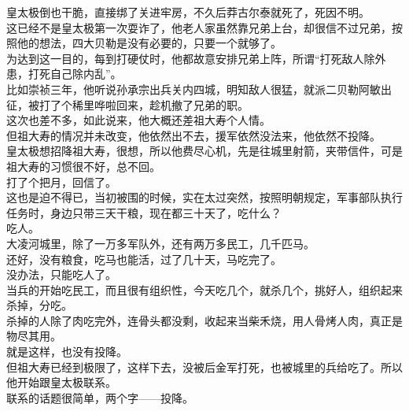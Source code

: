 \begin{multicols}{\theparacolNo}
皇太极倒也干脆，直接绑了关进牢房，不久后莽古尔泰就死了，死因不明。\\

这已经不是皇太极第一次耍诈了，他老人家虽然靠兄弟上台，却很信不过兄弟，按照他的想法，四大贝勒是没有必要的，只要一个就够了。\\

为达到这一目的，每到打硬仗时，他都故意安排兄弟上阵，所谓“打死敌人除外患，打死自己除内乱”。\\

比如崇祯三年，他听说孙承宗出兵关内四城，明知敌人很猛，就派二贝勒阿敏出征，被打了个稀里哗啦回来，趁机撤了兄弟的职。\\

这次也差不多，如此说来，他大概还差祖大寿个人情。\\

但祖大寿的情况并未改变，他依然出不去，援军依然没法来，他依然不投降。\\

皇太极想招降祖大寿，很想，所以他费尽心机，先是往城里射箭，夹带信件，可是祖大寿的习惯很不好，总不回。\\

打了个把月，回信了。\\

这也是迫不得已，当初被围的时候，实在太过突然，按照明朝规定，军事部队执行任务时，身边只带三天干粮，现在都三十天了，吃什么？\\

吃人。\\

大凌河城里，除了一万多军队外，还有两万多民工，几千匹马。\\

还好，没有粮食，吃马也能活，过了几十天，马吃完了。\\

没办法，只能吃人了。\\

当兵的开始吃民工，而且很有组织性，今天吃几个，就杀几个，挑好人，组织起来杀掉，分吃。\\

杀掉的人除了肉吃完外，连骨头都没剩，收起来当柴禾烧，用人骨烤人肉，真正是物尽其用。\\

就是这样，也没有投降。\\

但祖大寿已经到极限了，这样下去，没被后金军打死，也被城里的兵给吃了。所以他开始跟皇太极联系。\\

联系的话题很简单，两个字——投降。\\


\end{multicols}
